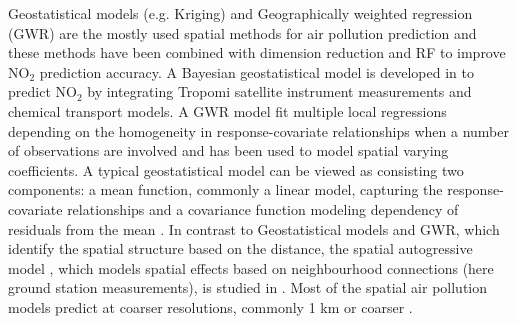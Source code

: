 \documentclass{article}
\begin{document}
Geostatistical models (e.g. Kriging) and Geographically weighted regression (GWR) are the mostly used spatial methods for air pollution prediction \citep{vicedo2013bayesian,li2014estimating,wang2021impacts,zou2016high} and these methods have been combined with dimension reduction \cite{zhai2018improved} and RF \citep{zhan2018satellite,liu2020integrate} to improve NO$_2$ prediction accuracy. A Bayesian geostatistical model is developed in \cite{BELOCONI2020105578} to predict NO$_2$ by integrating Tropomi satellite instrument measurements and chemical transport models. A GWR model fit multiple local regressions depending on the homogeneity in response-covariate relationships when a number of observations are involved and has been used to model spatial varying coefficients. A typical geostatistical model can be viewed as consisting two components: a mean function, commonly a linear model, capturing the response-covariate relationships and a covariance function modeling dependency of residuals from the mean \citep{stackinla}. In contrast to Geostatistical models and GWR, which identify the spatial structure based on the distance, the spatial autogressive model \citep{anselin2001spatial}, which models spatial effects based on neighbourhood connections (here ground station measurements), is studied in \cite{BERTAZZON20159}. Most of the spatial air pollution models predict at coarser resolutions, commonly 1 km or coarser \citep{young2016satellite,shaddick2018data,BELOCONI2020105578}.



\end{document}
